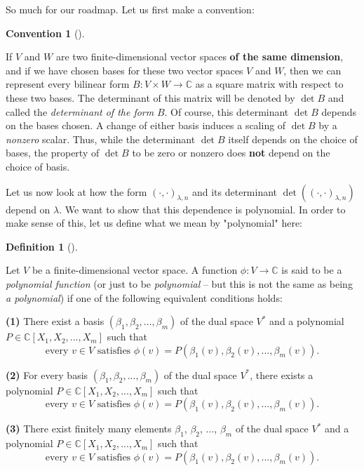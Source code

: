 \documentclass
[numbers=enddot,12pt,final,onecolumn,german,notitlepage]{scrartcl}%
\theoremstyle{definition}
\newtheorem{defi}[theo]{Definition}
\newenvironment{definition}[1][]
{\begin{defi}[#1]\begin{leftbar}}
{\end{leftbar}\end{defi}}
\newtheorem{conv}[theo]{Convention}
\newenvironment{Convention}[1][]
{\begin{conv}[#1]\begin{leftbar}}
{\end{leftbar}\end{conv}}
\begin{document}
So much for our roadmap. Let us first make a convention:

\begin{Convention}
If $V$ and $W$ are two finite-dimensional vector spaces \textbf{of the same
dimension}, and if we have chosen bases for these two vector spaces $V$ and
$W$, then we can represent every bilinear form $B:V\times W\rightarrow
\mathbb{C}$ as a square matrix with respect to these two bases. The
determinant of this matrix will be denoted by $\det B$ and called the
\textit{determinant of the form }$B$. Of course, this determinant $\det B$
depends on the bases chosen. A change of either basis induces a scaling of
$\det B$ by a \textit{nonzero} scalar. Thus, while the determinant $\det B$
itself depends on the choice of bases, the property of $\det B$ to be zero or
nonzero does \textbf{not} depend on the choice of basis.
\end{Convention}

Let us now look at how the form $\left(  \cdot,\cdot\right)  _{\lambda,n}$ and
its determinant $\det\left(  \left(  \cdot,\cdot\right)  _{\lambda,n}\right)
$ depend on $\lambda$. We want to show that this dependence is polynomial. In
order to make sense of this, let us define what we mean by "polynomial" here:

\begin{definition}
\label{def.det.US.poly}Let $V$ be a finite-dimensional vector space. A
function $\phi:V\rightarrow\mathbb{C}$ is said to be a \textit{polynomial
function} (or just to be \textit{polynomial} -- but this is not the same as
being \textit{a polynomial}) if one of the following equivalent conditions holds:

\textbf{(1)} There exist a basis $\left(  \beta_{1},\beta_{2},...,\beta
_{m}\right)  $ of the dual space $V^{\ast}$ and a polynomial $P\in
\mathbb{C}\left[  X_{1},X_{2},...,X_{m}\right]  $ such that%
\[
\text{every }v\in V\text{ satisfies }\phi\left(  v\right)  =P\left(  \beta
_{1}\left(  v\right)  ,\beta_{2}\left(  v\right)  ,...,\beta_{m}\left(
v\right)  \right)  .
\]


\textbf{(2)} For every basis $\left(  \beta_{1},\beta_{2},...,\beta
_{m}\right)  $ of the dual space $V^{\ast}$, there exists a polynomial
$P\in\mathbb{C}\left[  X_{1},X_{2},...,X_{m}\right]  $ such that%
\[
\text{every }v\in V\text{ satisfies }\phi\left(  v\right)  =P\left(  \beta
_{1}\left(  v\right)  ,\beta_{2}\left(  v\right)  ,...,\beta_{m}\left(
v\right)  \right)  .
\]


\textbf{(3)} There exist finitely many elements $\beta_{1}$, $\beta_{2}$,
$...$, $\beta_{m}$ of the dual space $V^{\ast}$ and a polynomial
$P\in\mathbb{C}\left[  X_{1},X_{2},...,X_{m}\right]  $ such that%
\[
\text{every }v\in V\text{ satisfies }\phi\left(  v\right)  =P\left(  \beta
_{1}\left(  v\right)  ,\beta_{2}\left(  v\right)  ,...,\beta_{m}\left(
v\right)  \right)  .
\]

\end{definition}
\end{document}
